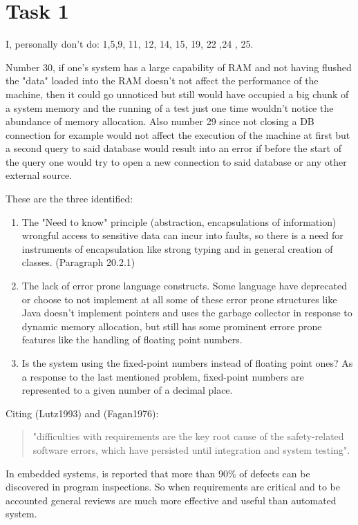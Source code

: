 \chapter{Task 1}
\begin{parlist}
	\item I, personally don't do: 1,5,9, 11, 12, 14, 15, 19, 22 ,24 , 25.
	\item 
	\item Number 30, if one's system has a large capability of RAM and not having flushed the "data" loaded into the RAM doesn't not affect the performance of the machine, then it could go unnoticed but still would have occupied a big chunk of a system memory and the running of a test just one time wouldn't notice the abundance of memory allocation. Also number 29 since not closing a DB connection for example would not affect the execution of the machine at first but a second query to said database would result into an error if before the start of the query one would try to open a new connection to said database or any other external source.
	\item These are the three identified:
		\begin{enumerate}
			\item The "Need to know" principle (abstraction, encapsulations of information) wrongful access to sensitive data can incur into faults, so there is a need for instruments of encapsulation like strong typing and in general creation of classes. \cite{Sommerville2004}(Paragraph 20.2.1)
			\item The lack of error prone language constructs. Some language have deprecated or choose to not implement at all some of these error prone structures like Java doesn't implement pointers and uses the garbage collector in response to dynamic memory allocation, but still has some prominent errore prone features like the handling of floating point numbers. \cite{Sommerville2004}
			\item Is the system using the fixed-point numbers instead of floating point ones? As a response to the last mentioned problem, fixed-point numbers are represented to a given number of a decimal place. \cite{Sommerville2004}
		\end{enumerate}
 \newpage
	\item Citing (Lutz1993)\cite{Lutz1993} and (Fagan1976)\cite{Fagan2002}:\begin{quotation}
			"difficulties with requirements are the key root cause of the safety-related software errors, which have persisted until integration and system testing".\end{quotation}
		In embedded systems, is reported that more than 90\% of defects can be discovered in program inspections. So when requirements are critical and to be accounted general reviews are much more effective and useful than automated system. \\
		

\end{parlist}
